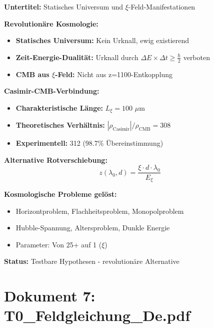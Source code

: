 	\begin{documentbox}
		\textbf{Untertitel:} Statisches Universum und $\xi$-Feld-Manifestationen
		
		\textbf{Revolutionäre Kosmologie:}
		\begin{itemize}
			\item \textbf{Statisches Universum:} Kein Urknall, ewig existierend
			\item \textbf{Zeit-Energie-Dualität:} Urknall durch $\Delta E \times \Delta t \geq \frac{\hbar}{2}$ verboten
			\item \textbf{CMB aus $\xi$-Feld:} Nicht aus z=1100-Entkopplung
		\end{itemize}
		
		\textbf{Casimir-CMB-Verbindung:}
		\begin{itemize}
			\item \textbf{Charakteristische Länge:} $L_\xi = 100$ $\mu$m
			\item \textbf{Theoretisches Verhältnis:} $|\rho_{\text{Casimir}}|/\rho_{\text{CMB}} = 308$
			\item \textbf{Experimentell:} 312 (98.7\% Übereinstimmung)
		\end{itemize}
		
		\textbf{Alternative Rotverschiebung:}
		\begin{equation}
			z(\lambda_0, d) = \frac{\xi \cdot d \cdot \lambda_0}{E_\xi}
		\end{equation}
		
		\textbf{Kosmologische Probleme gelöst:}
		\begin{itemize}
			\item Horizontproblem, Flachheitsproblem, Monopolproblem
			\item Hubble-Spannung, Altersproblem, Dunkle Energie
			\item Parameter: Von 25+ auf 1 ($\xi$)
		\end{itemize}
		
		\textbf{Status:} Testbare Hypothesen - revolutionäre Alternative
	\end{documentbox}
	
	\section{Dokument 7: T0\_Feldgleichung\_De.pdf}
	
